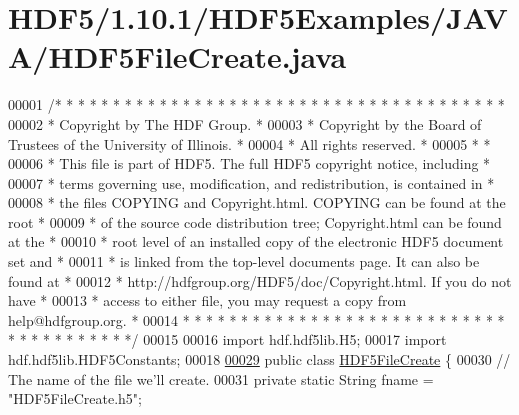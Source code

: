 \hypertarget{_h_d_f5_21_810_81_2_h_d_f5_examples_2_j_a_v_a_2_h_d_f5_file_create_8java_source}{}\section{H\+D\+F5/1.10.1/\+H\+D\+F5\+Examples/\+J\+A\+V\+A/\+H\+D\+F5\+File\+Create.java}
\label{_h_d_f5_21_810_81_2_h_d_f5_examples_2_j_a_v_a_2_h_d_f5_file_create_8java_source}

\begin{DoxyCode}
00001 \textcolor{comment}{/* * * * * * * * * * * * * * * * * * * * * * * * * * * * * * * * * * * * * * *}
00002 \textcolor{comment}{ * Copyright by The HDF Group.                                               *}
00003 \textcolor{comment}{ * Copyright by the Board of Trustees of the University of Illinois.         *}
00004 \textcolor{comment}{ * All rights reserved.                                                      *}
00005 \textcolor{comment}{ *                                                                           *}
00006 \textcolor{comment}{ * This file is part of HDF5.  The full HDF5 copyright notice, including     *}
00007 \textcolor{comment}{ * terms governing use, modification, and redistribution, is contained in    *}
00008 \textcolor{comment}{ * the files COPYING and Copyright.html.  COPYING can be found at the root   *}
00009 \textcolor{comment}{ * of the source code distribution tree; Copyright.html can be found at the  *}
00010 \textcolor{comment}{ * root level of an installed copy of the electronic HDF5 document set and   *}
00011 \textcolor{comment}{ * is linked from the top-level documents page.  It can also be found at     *}
00012 \textcolor{comment}{ * http://hdfgroup.org/HDF5/doc/Copyright.html.  If you do not have          *}
00013 \textcolor{comment}{ * access to either file, you may request a copy from help@hdfgroup.org.     *}
00014 \textcolor{comment}{ * * * * * * * * * * * * * * * * * * * * * * * * * * * * * * * * * * * * * * */}
00015 
00016 \textcolor{keyword}{import} hdf.hdf5lib.H5;
00017 \textcolor{keyword}{import} hdf.hdf5lib.HDF5Constants;
00018 
\hyperlink{class_h_d_f5_file_create}{00029} \textcolor{keyword}{public} \textcolor{keyword}{class }\hyperlink{class_h_d_f5_file_create}{HDF5FileCreate} \{
00030     \textcolor{comment}{// The name of the file we'll create.}
00031     \textcolor{keyword}{private} \textcolor{keyword}{static} String fname = \textcolor{stringliteral}{"HDF5FileCreate.h5"};

\end{DoxyCode}
